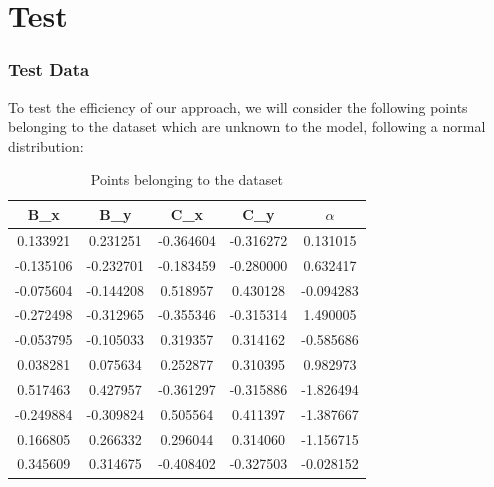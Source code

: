 \documentclass{beamer}
\begin{document}
    \section{Test}
    \begin{frame}
        \frametitle{Test Data}
        To test the efficiency of our approach, we will consider the following points belonging to the dataset which are unknown to the model, following a normal distribution:
        \begin{table}[h]
            \centering
            \begin{tabular}{|c|c|c|c|c|}
                \hline
                B\_x & B\_y & C\_x & C\_y & $\alpha$ \\
                \hline
                0.133921 & 0.231251 & -0.364604 & -0.316272 & 0.131015 \\
                -0.135106 & -0.232701 & -0.183459 & -0.280000 & 0.632417 \\
                -0.075604 & -0.144208 & 0.518957 & 0.430128 & -0.094283 \\
                -0.272498 & -0.312965 & -0.355346 & -0.315314 & 1.490005 \\
                -0.053795 & -0.105033 & 0.319357 & 0.314162 & -0.585686 \\
                0.038281 & 0.075634 & 0.252877 & 0.310395 & 0.982973 \\
                0.517463 & 0.427957 & -0.361297 & -0.315886 & -1.826494 \\
                -0.249884 & -0.309824 & 0.505564 & 0.411397 & -1.387667 \\
                0.166805 & 0.266332 & 0.296044 & 0.314060 & -1.156715 \\
                0.345609 & 0.314675 & -0.408402 & -0.327503 & -0.028152 \\
                \hline
            \end{tabular}
            \caption{Points belonging to the dataset}
        \end{table}
    \end{frame}
\end{document}
